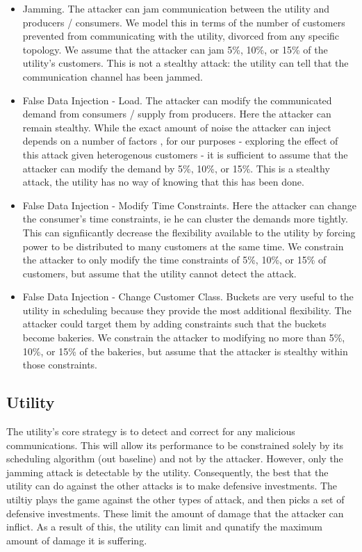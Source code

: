 \documentclass[conference]{IEEEtran}
\begin{document}
\begin{itemize}
\item Jamming. The attacker can jam communication between the utility and producers / consumers.  We model this in terms of the number of customers prevented from communicating with the utility, divorced from any specific topology.  We assume that the attacker can jam 5\%, 10\%, or 15\% of the utility's customers.  This is not a stealthy attack: the utility can tell that the communication channel has been jammed.

\item False Data Injection - Load. The attacker can modify the communicated demand from consumers / supply from producers.  Here the attacker can remain stealthy.  While the exact amount of noise the attacker can inject depends on a number of factors \cite{yuan2011modeling}, for our purposes - exploring the effect of this attack given heterogenous customers - it is sufficient to assume that the attacker can modify the demand by 5\%, 10\%, or 15\%.  This is a stealthy attack, the utility has no way of knowing that this has been done.

\item False Data Injection - Modify Time Constraints. Here the attacker can change the consumer's time constraints, ie he can cluster the demands more tightly.  This can signfiicantly decrease the flexibility available to the utility by forcing power to be distributed to many customers at the same time.  We constrain the attacker to only modify the time constraints of 5\%, 10\%, or 15\% of customers, but assume that the utility cannot detect the attack.

\item False Data Injection - Change Customer Class.  Buckets are very useful to the utility in scheduling because they provide
the most additional flexibility.  The attacker could target them by adding constraints such that the buckets become bakeries.  We constrain the attacker to modifying no more than 5\%, 10\%, or 15\% of the bakeries, but assume that the attacker is stealthy within those constraints.

\end{itemize}

\subsection{Utility}
\label{Utility2}

The utility's core strategy is to detect and correct for any malicious communications.  This will allow its performance to be
constrained solely by its scheduling algorithm (out baseline) and not by the attacker.  However, only the jamming attack is detectable by the utility.  Consequently, the best that the utility can do against the other attacks is to make defensive investments.  The utiltiy plays the game against the other types of attack, and then picks a set of defensive investments.  These limit the amount of damage that the attacker can inflict.  As a result of this, the utility can limit and qunatify the maximum amount of damage it is suffering.
\end{document}
